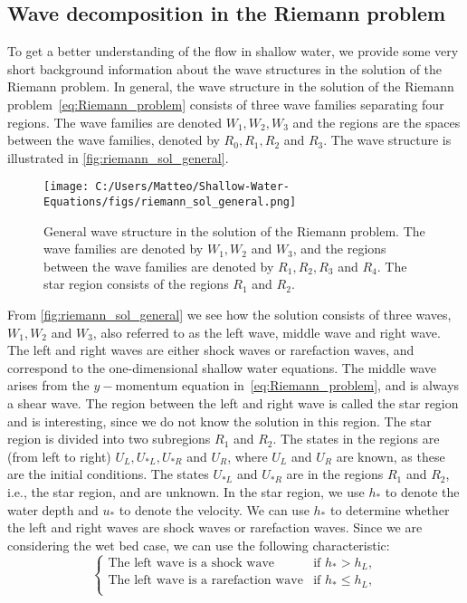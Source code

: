 \subsection{Wave decomposition in the Riemann problem}
To get a better understanding of the flow in shallow water, we provide some very short background information about the wave structures in the solution of the Riemann problem.
In general, the wave structure in the solution of the Riemann problem~\eqref{eq:Riemann_problem} consists of three wave families separating four regions.
The wave families are denoted $W_1, W_2, W_3$ and the regions are the spaces between the wave families, denoted by $R_0, R_1, R_2$ and $R_3$.
The wave structure is illustrated in \autoref{fig:riemann_sol_general}.
\begin{figure}[H]
    \centering
    \texttt{[image: C:/Users/Matteo/Shallow-Water-Equations/figs/riemann\_sol\_general.png]}
    \caption{General wave structure in the solution of the Riemann problem.
            The wave families are denoted by $W_1, W_2$ and $W_3$, and the regions between the wave families are denoted by $R_1, R_2, R_3$ and $R_4$. 
            The star region consists of the regions $R_1$ and $R_2$.}\label{fig:riemann_sol_general}
\end{figure}
From \autoref{fig:riemann_sol_general} we see how the solution consists of three waves, $W_1, W_2$ and $W_3$, also referred to as the left wave, middle wave and right wave.
The left and right waves are either shock waves or rarefaction waves, and correspond to the one-dimensional shallow water equations.
The middle wave arises from the $y-$momentum equation in~\eqref{eq:Riemann_problem}, and is always a shear wave.
The region between the left and right wave is called the star region and is interesting, since we do not know the solution in this region.
The star region is divided into two subregions $R_1$ and $R_2$.
The states in the regions are (from left to right) $U_L, U_{*L}, U_{*R}$ and $U_R$, where $U_L$ and $U_R$ are known, as these are the initial conditions.
The states $U_{*L}$ and $U_{*R}$ are in the regions $R_1$ and $R_2$, i.e., the star region, and are unknown.
In the star region, we use $h_*$ to denote the water depth and $u_*$ to denote the velocity.
We can use $h_*$ to determine whether the left and right waves are shock waves or rarefaction waves.
Since we are considering the wet bed case, we can use the following characteristic:
\begin{equation}\label{eq:def_left_wave}
    \begin{cases}
        \text{The left wave is a shock wave} & \text{if } h_* > h_L, \\
        \text{The left wave is a rarefaction wave} & \text{if } h_* \leq h_L, \\        
    \end{cases} 
\end{equation}

